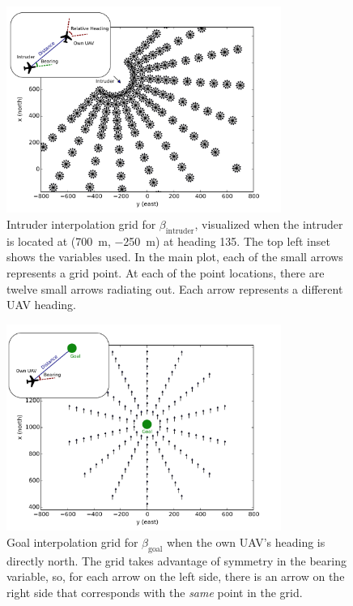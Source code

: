 \begin{figure}[p]
    \centering
    \includegraphics[width=0.8\textwidth]{media/intruder_grid_plus.pdf}
    \caption[Intruder interpolation grid]{Intruder interpolation grid for $\beta_\text{intruder}$, visualized when the intruder is located at (\SI{700}{m}, \SI{-250}{m}) at heading \num{135}. The top left inset shows the variables used. In the main plot, each of the small arrows represents a grid point. At each of the point locations, there are twelve small arrows radiating out. Each arrow represents a different UAV heading.}
    \label{fig:intrudergrid}
\end{figure}
\begin{figure}[p]
    \centering
    \includegraphics[width=0.8\textwidth]{media/goal_grid_plus.pdf}
    \caption[Goal interpolation grid]{Goal interpolation grid for $\beta_\text{goal}$ when the own UAV's heading is directly north. The grid takes advantage of symmetry in the bearing variable, so, for each arrow on the left side, there is an arrow on the right side that corresponds with the \emph{same} point in the grid.}
    \label{fig:goalgrid}
\end{figure}

